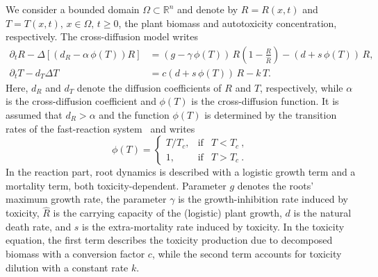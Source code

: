 \documentclass[a4paper,10pt,abstract=true,parskip=true]{scrartcl}
\theoremstyle{remark}
\numberwithin{equation}{section}
\numberwithin{thm}{section}
\begin{document}
We consider a bounded domain $\Omega \subset \mathbb{R}^n$ and denote by $R=R(x,t)$ and $T=T(x,t), \, x\in \Omega, \, t\geq 0$, the plant biomass and autotoxicity concentration, respectively. The cross-diffusion model writes
\begin{subequations}\label{eq:model_specific}
\begin{align}
 \partial_t R - \Delta \left[(d_R - \alpha\,\phi(T))R\right] &= (g - \gamma\,\phi(T))\,R\left(1-\frac{R}{\hat{R}}\right) - (d+s\,\phi(T))\,R, \label{eq:model_specific_R}\\
 \partial_t T - d_T \Delta T &= c(d+s\,\phi(T))\,R-k\,T\label{eq:model_specific_T}.
\end{align}
\end{subequations}
Here, $d_R$ and $d_T$ denote the diffusion coefficients of $R$ and $T$, respectively, while $\alpha$ is the cross-diffusion coefficient and $\phi(T)$ is the cross-diffusion function. It is assumed that $d_R>\alpha$ and the function $\phi(T)$ is determined by the transition rates of the fast-reaction system~\cite{GIS_2026} and writes
\begin{equation}
\phi(T) = \left\{\begin{array}{rcl} T/T_c, & \text{if} & T<T_c \ , \\ 1, & \text{if} & T>T_c\ .\end{array}\right.  \label{eq:pwphi}    
\end{equation}
In the reaction part, root dynamics is described with a logistic growth term and a mortality term, both toxicity-dependent. Parameter $g$ denotes the roots' maximum growth rate, the parameter $\gamma$ is the growth-inhibition rate induced by toxicity, $\hat{R}$ is the carrying capacity of the (logistic) plant growth, $d$ is the natural death rate, and $s$ is the extra-mortality rate induced by toxicity. In the toxicity equation, the first term describes the toxicity production due to decomposed biomass with a conversion factor $c$, while the second term accounts for toxicity dilution with a constant rate $k$.
\end{document}
